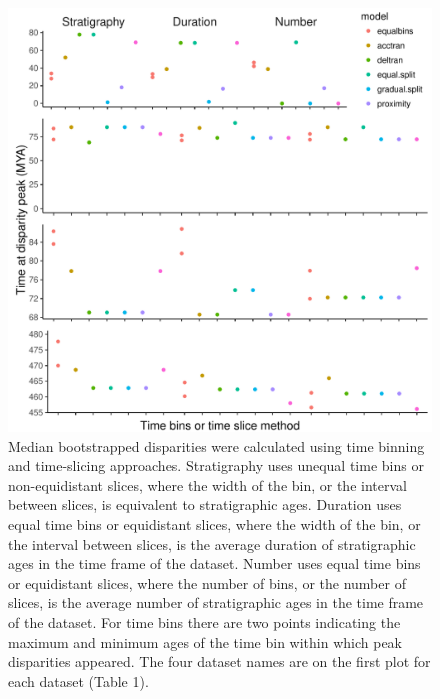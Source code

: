 \documentclass[12pt,a4paper]{article}
\begin{document}
\begin{figure}[!htbp]
    \centering
    \includegraphics[width=1\linewidth, height=1\textheight, keepaspectratio]{figures/fig-peaks-age-appendix.pdf}
    \caption[Timing of peak disparity for four example datasets.]
    {Median bootstrapped disparities were calculated using time binning and time-slicing approaches. 
    Stratigraphy uses unequal time bins or non-equidistant slices, where the width of the bin, or the interval between slices, is equivalent to stratigraphic ages. 
    Duration uses equal time bins or equidistant slices, where the width of the bin, or the interval between slices, is the average duration of stratigraphic ages in the time frame of the dataset. 
    Number uses equal time bins or equidistant slices, where the number of bins, or the number of slices, is the average number of stratigraphic ages in the time frame of the dataset. 
    For time bins there are two points indicating the maximum and minimum ages of the time bin within which peak disparities appeared.
    The four dataset names are on the first plot for each dataset (Table 1).}
    \label{figure:peak3}
  \end{figure}

\end{document}
